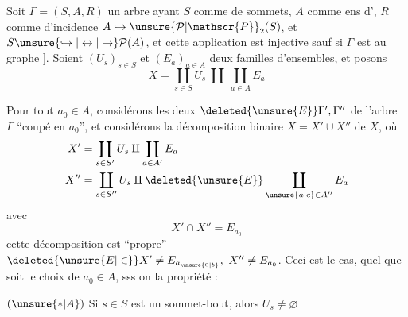 Soit  $\Gamma=(S,A,R)$ un arbre ayant $S$ comme  de sommets, $A$ \unsure{-} comme ens d', $R$ comme  d'incidence \unsure{[|E}
$A\hookrightarrow\unsure{\mathcal{P}|\mathscr{P}}_2(S)$, et $S\unsure{\hookrightarrow|\leftrightarrow|\mapsto}\mathcal{P}(A)$, et cette application est injective sauf si $\Gamma$ est  au graphe
\diagram{\begin{tikzcd}[ampersand replacement=\&,column sep=1.4em]
\bullet \arrow[r,dash] \& \bullet
\end{tikzcd}}
]. Soient $(U_s)_{s\in S}$ et $(E_a)_{a\in A}$ deux familles d'ensembles, et posons
\[
X=\coprod_{s\in S}U_s\ \amalg\ \coprod_{a\in A}E_a
\]

Pour tout $a_0\in A$, considérons les deux   $\deleted{\unsure{E}}\Gamma',\Gamma''$ de l'arbre $\Gamma$ ``coupé en $a_0$'', et considérons la décomposition binaire  $X=X'\cup X''$ de $X$,
où
\[
\begin{aligned}
X'&=\coprod_{s\in S'}U_s\amalg\coprod_{a\in A'}E_a\\
X''&=\coprod_{s\in S''}U_s\amalg\deleted{\unsure{E}}\coprod_{\unsure{a|c}\in A''}E_a
\end{aligned}
\]
avec
\[
X'\cap X''=E_{a_0}
\]
cette décomposition est ``propre''\  $\deleted{\unsure{E|\in}}X'\ne E_{a_{\unsure{0|b}}},\ X''\ne E_{a_0}$. Ceci est le cas, quel que soit le choix de $a_0\in A$, sss on  la propriété  :

$(\unsure{\ast|A})$ Si $s\in S$ est un sommet-bout, alors $U_s\ne\varnothing$
